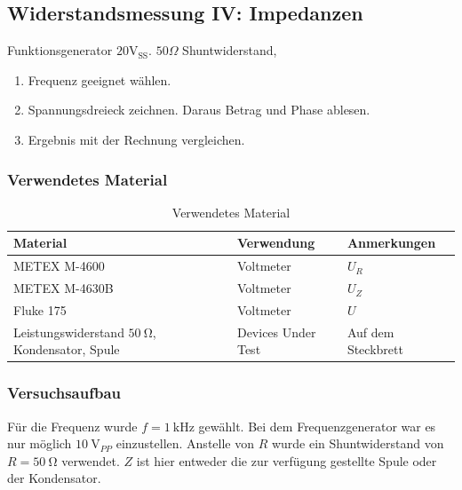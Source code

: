 \newpage
\subsection{Widerstandsmessung IV: Impedanzen}\label{sec:1-4}

\begin{highlightblock}
	Funktionsgenerator $20\mathrm{V_{SS}}$. $50\Omega$ Shuntwiderstand,
	\begin{enumerate}[label=\textbf{\alph*:}, ref=\alph*, noitemsep]
		\item\label{itm:1-P4-1} Frequenz geeignet wählen.
		\item\label{itm:1-P4-2} Spannungsdreieck zeichnen. Daraus Betrag und Phase ablesen.
		\item\label{itm:1-P4-3} Ergebnis mit der Rechnung vergleichen.
	\end{enumerate}
\end{highlightblock}

\subsubsection{Verwendetes Material}

\begin{table}[h]
	\centering
	\caption{Verwendetes Material}
	\begin{tabularx}{\textwidth}{XXX}
		\textbf{Material}                                       & \textbf{Verwendung} & \textbf{Anmerkungen} \\ \midrule
		METEX M-4600                                            & Voltmeter           & $U_R$                \\
		METEX M-4630B                                           & Voltmeter           & $U_Z$                \\
		Fluke 175                                               & Voltmeter           & $U$                  \\
		Leistungswiderstand $\SI{50}{\ohm}$, Kondensator, Spule & Devices Under Test  & Auf dem Steckbrett   \\
	\end{tabularx}
\end{table}

\subsubsection{Versuchsaufbau}

\marginref{\ref{itm:1-P4-1}}
Für die Frequenz wurde $f=\SI{1}{\kilo\hertz}$ gewählt. Bei dem
Frequenzgenerator war es nur möglich $\SI{10}{\volt}_{PP}$ einzustellen.
Anstelle von $R$ wurde ein Shuntwiderstand von $R=\SI{50}{\ohm}$ verwendet.
$Z$ ist hier entweder die zur verfügung gestellte Spule oder der Kondensator.


